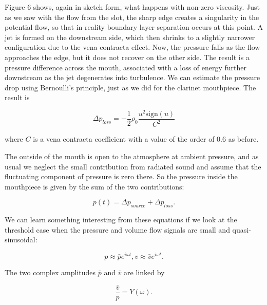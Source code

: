   Figure 6 shows, again in sketch form, what happens with non-zero viscosity. 
  Just as we saw with the flow from the slot, the sharp edge creates a 
  singularity in the potential flow, so that in reality boundary layer 
  separation occurs at this point. A jet is formed on the downstream side, 
  which then shrinks to a slightly narrower configuration due to the vena 
  contracta effect. Now, the pressure falls as the flow approaches the edge, 
  but it does not recover on the other side. The result is a pressure 
  difference across the mouth, associated with a loss of energy further 
  downstream as the jet degenerates into turbulence. We can estimate the 
  pressure drop using Bernoulli's principle, just as we did for the clarinet 
  mouthpiece. The result is 

  \begin{equation*}\Delta p_{loss} = -\dfrac{1}{2} \rho_0 \dfrac{u^2 
  \mathrm{sign}(u)}{C^2} \tag{9}\end{equation*} 

  \noindent{}where $C$ is a vena contracta coefficient with a value of the 
  order of 0.6 as before. 


  The outside of the mouth is open to the atmosphere at ambient pressure, and 
  as usual we neglect the small contribution from radiated sound and assume 
  that the fluctuating component of pressure is zero there. So the pressure 
  inside the mouthpiece is given by the sum of the two contributions: 

  \begin{equation*}p(t)=\Delta p_{source} + \Delta p_{loss} . 
  \tag{10}\end{equation*} 

  We can learn something interesting from these equations if we look at the 
  threshold case when the pressure and volume flow signals are small and 
  quasi-sinusoidal: 

  \begin{equation*}p \approx \bar{p}e^{i \omega t}, v \approx \bar{v}e^{i 
  \omega t} . \tag{11}\end{equation*} 

  The two complex amplitudes $\bar{p}$ and $\bar{v}$ are linked by 

  \begin{equation*}\dfrac{\bar{v}}{\bar{p}} = Y(\omega) . 
  \tag{12}\end{equation*} 

